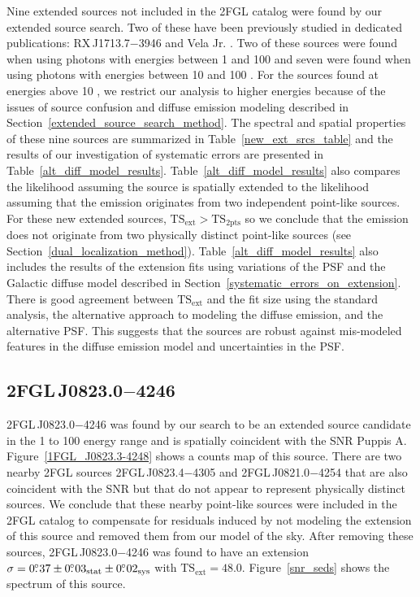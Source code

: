 \documentclass[12pt,preprint]{aastex}
\newcommand{\gev}{\text{GeV}\xspace}
\newcommand{\tsext}{{\ensuremath{\text{TS}_{\text{ext}}}}\xspace}
\newcommand{\tsinc}{\ensuremath{\text{TS}_{\text{2pts}}}\xspace}
\newcommand{\sys}{\text{sys}\xspace}
\newcommand{\stat}{\text{stat}\xspace}
\begin{document}
Nine extended sources not included in the 2FGL catalog were found by our
extended source search. Two of these have been previously
studied in dedicated publications: RX\,J1713.7$-$3946 and Vela
Jr. \citep{rx_j1713_lat,vela_jr_lat}.
Two of these sources were
found when using photons with energies between 1 \gev and 100 \gev and seven
were found when using photons with energies between 10 \gev and 100 \gev.
For the sources found at energies above 10 \gev, we restrict our
analysis to higher energies because of the issues
of source confusion and diffuse emission modeling described in
Section~\ref{extended_source_search_method}.
The spectral and spatial properties of these nine sources are summarized
in Table~\ref{new_ext_srcs_table} and the results of our investigation of
systematic errors are presented in Table~\ref{alt_diff_model_results}.
Table~\ref{alt_diff_model_results}
also
compares the likelihood assuming the source is spatially
extended to the likelihood assuming 
that the emission originates from two independent point-like
sources. For these new extended sources, $\tsext>\tsinc$ 
so we conclude that 
the \gev emission does not originate from two physically
distinct point-like sources (see Section~\ref{dual_localization_method}).  
Table~\ref{alt_diff_model_results} also includes the
results of the extension fits using variations of the PSF and the Galactic
diffuse model described in Section~\ref{systematic_errors_on_extension}.
There is good agreement between \tsext and the fit size using the standard
analysis, the alternative approach to modeling the diffuse emission, and the alternative PSF.
This suggests that the sources are robust against mis-modeled features in the diffuse
emission model and uncertainties in the PSF.

\subsection{2FGL\,J0823.0$-$4246}
\label{section_2FGL_J0823.0-4246}


2FGL\,J0823.0$-$4246 was found by our search to be an extended source
candidate in the 1 \gev to 100 \gev energy range and is spatially
coincident with the SNR Puppis A.  Figure~\ref{1FGL_J0823.3-4248} shows
a counts map of this source. There are two nearby 2FGL sources 2FGL\,J0823.4$-$4305
and 2FGL\,J0821.0$-$4254 that are also coincident with the SNR but that
do not appear to represent physically distinct sources.
We conclude that
these nearby point-like sources
were included in the 2FGL catalog to compensate for residuals induced
by not modeling the extension of this source and
removed them from our model of the sky.
After removing these sources, 2FGL\,J0823.0$-$4246 was found to have an extension 
$\sigma=0\fdg37\pm0\fdg03_\stat\pm0\fdg02_\sys$ with 
$\tsext=48.0$.  Figure~\ref{snr_seds} shows the spectrum of
this source.
\end{document}
